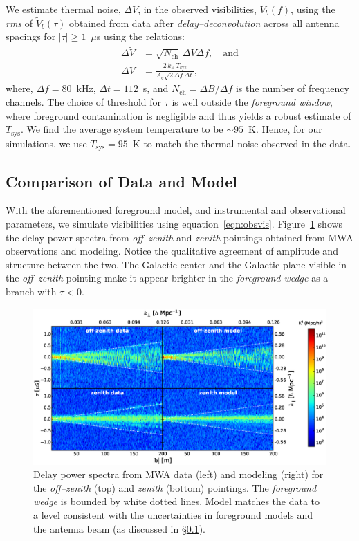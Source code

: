 \documentclass[preprint2,iop,numberedappendix,twocolappendix,appendixfloats]{emulateapj}
\begin{document}
We estimate thermal noise, $\Delta V$, in the observed visibilities, $V_b(f)$, using the {\it rms} of $\tilde{V}_b(\tau)$ obtained from data after {\it delay--deconvolution} across all antenna spacings for $|\tau| \geq 1$~$\mu$s using the relations:
\begin{align}\label{eqn:Tsys}
  \Delta \tilde{V} &= \sqrt{N_\textrm{ch}}\,\Delta V \Delta f, \quad\textrm{and} \\
  \Delta V &= \frac{2\,k_\textrm{B}\,T_\textrm{sys}}{A_\textrm{e}\sqrt{2\,\Delta f\,\Delta t}},
\end{align}
where, $\Delta f = 80$~kHz, $\Delta t = 112$~s, and $N_\textrm{ch}=\Delta B/\Delta f$ is the number of frequency channels. The choice of threshold for $\tau$ is well outside the {\it foreground window}, where foreground contamination is negligible and thus yields a robust estimate of $T_\textrm{sys}$. We find the average system temperature to be $\sim 95$~K. Hence, for our simulations, we use $T_\textrm{sys}=95$~K to match the thermal noise observed in the data. 

\subsection{Comparison of Data and Model}\label{sec:data-vs-model}

With the aforementioned foreground model, and instrumental and observational parameters, we simulate visibilities using equation~\ref{eqn:obsvis}. Figure~\ref{fig:fhd-sim-comparison} shows the delay power spectra from {\it off--zenith} and {\it zenith} pointings obtained from MWA observations and modeling. Notice the qualitative agreement of amplitude and structure between the two. The Galactic center and the Galactic plane visible in the {\it off--zenith} pointing make it appear brighter in the {\it foreground wedge} as a branch with $\tau<0$. 

\begin{figure}[htb]
\centering
\includegraphics[width=\linewidth]{figure6.eps}
\caption{Delay power spectra from MWA data (left) and modeling (right) for the {\it off--zenith} (top) and {\it zenith} (bottom) pointings. The {\it foreground wedge} is bounded by white dotted lines. Model matches the data to a level consistent with the uncertainties in foreground models and the antenna beam (as discussed in \S\ref{sec:data-vs-model}). \label{fig:fhd-sim-comparison}}
\end{figure}
\end{document}
